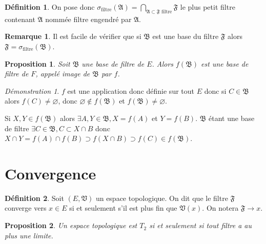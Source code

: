 \documentclass[a4paper, 11pt, french]{book}
\newenvironment{itemise}{\itemize}{\enditemize}
\theoremstyle{plain} %
\newtheorem{proposition}{Proposition}
\theoremstyle{definition} %
\newtheorem{definition}{Définition}
\newtheorem{remarque}{Remarque}
\theoremstyle{remark} %
\newtheorem*{demonstration}{Démonstration}
\newcommand{\1}{\mathds{1}}
\newcommand\vide{\varnothing}
\begin{document}
\begin{definition}
	On pose donc $\sigma_\text{filtre}(\mathfrak{A})=\bigcap_{\mathfrak{A}\subset\mathfrak{F}\text{ filtre}}\mathfrak{F}$ le plus petit filtre contenant $\mathfrak{A}$ nommée filtre engendré par $\mathfrak{A}$.
\end{definition}

\begin{remarque}
	Il est facile de vérifier que si $\mathfrak{B}$ est une base du filtre $\mathfrak{F}$ alors $\mathfrak{F}=\sigma_\text{filtre}(\mathfrak{B})$.
\end{remarque}

\begin{proposition}
	Soit $\mathfrak{B}$ une base de filtre de $E$.
	Alors $f(\mathfrak{B})$ est une base de filtre de $F$, appelé image de $\mathfrak{B}$ par $f$.
\end{proposition}

\begin{demonstration}
	\begin{itemise}
		\item $f$ est une application donc définie sur tout $E$ donc si $C\in\mathfrak{B}$ alors $f(C)\neq\vide$, donc $\vide\notin f(\mathfrak{B})$ et $f(\mathfrak{B})\neq\vide$.
		\item Si $X, Y\in f(\mathfrak{B})$ alors $\exists A, Y\in\mathfrak{B}, X=f(A)$ et $Y=f(B)$.
		$\mathfrak{B}$ étant une base de filtre $\exists C\in\mathfrak{B}, C\subset X\cap B$ donc $X\cap Y=f(A)\cap f(B)\supset f(X\cap B)\supset f(C)\in f(\mathfrak{B})$.
	\end{itemise}
\end{demonstration}

\section{Convergence}

\begin{definition}
	Soit $(E, \mathfrak{V})$ un espace topologique.
	On dit que le filtre $\mathfrak{F}$ converge vers $x\in E$ si et seulement s'il est plus fin que $\mathfrak{V}(x)$.
	On notera $\mathfrak{F}\rightarrow x$.
\end{definition}

\begin{proposition}
	Un espace topologique est $T_2$ si et seulement si tout filtre a au plus une limite.
\end{proposition}
\end{document}
